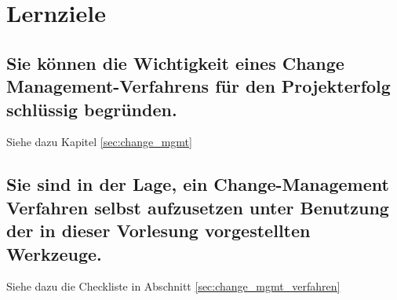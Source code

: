 \section{Lernziele}

\subsection{Sie können die Wichtigkeit eines Change Management-Verfahrens für den Projekterfolg schlüssig begründen.}
Siehe dazu Kapitel \ref{sec:change_mgmt}

\subsection{Sie sind in der Lage, ein Change-Management Verfahren selbst aufzusetzen unter Benutzung der in dieser Vorlesung vorgestellten Werkzeuge.}
Siehe dazu die Checkliste in Abschnitt \ref{sec:change_mgmt_verfahren}


